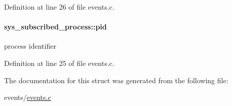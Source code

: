 Definition at line 26 of file events.\+c.

\hypertarget{structsys__subscribed__process_a921208fb1aaecfa56282941d9781a173}{}
\paragraph[{pid}]{ sys\+\_\+subscribed\+\_\+process\+::pid}\label{structsys__subscribed__process_a921208fb1aaecfa56282941d9781a173}
process identifier 

Definition at line 25 of file events.\+c.



The documentation for this struct was generated from the following file\+:\begin{DoxyCompactItemize}
\item 
events/\hyperlink{events_8c}{events.\+c}\end{DoxyCompactItemize}
